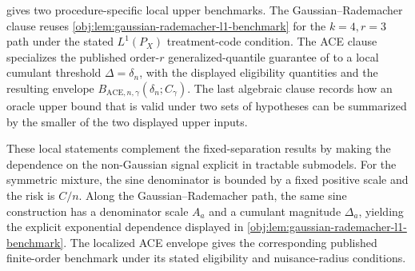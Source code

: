  gives two procedure-specific local upper benchmarks. The Gaussian--Rademacher clause reuses \cref{obj:lem:gaussian-rademacher-l1-benchmark} for the \(k=4,r=3\) path under the stated \(L^1(P_X)\) treatment-code condition. The ACE clause specializes the published order-\(r\) generalized-quantile guarantee of \citet{JinMackeySyrgkanis2025} to a local cumulant threshold \(\Delta=\delta_n\), with the displayed eligibility quantities and the resulting envelope \(B_{\mathrm{ACE},n,\gamma}(\delta_n;C_{\gamma})\). The last algebraic clause records how an oracle upper bound that is valid under two sets of hypotheses can be summarized by the smaller of the two displayed upper inputs.

These local statements complement the fixed-separation results by making the dependence on the non-Gaussian signal explicit in tractable submodels. For the symmetric mixture, the sine denominator is bounded by a fixed positive scale and the risk is \(C/n\). Along the Gaussian--Rademacher path, the same sine construction has a denominator scale \(A_a\) and a cumulant magnitude \(\Delta_a\), yielding the explicit exponential dependence displayed in \cref{obj:lem:gaussian-rademacher-l1-benchmark}. The localized ACE envelope gives the corresponding published finite-order benchmark under its stated eligibility and nuisance-radius conditions.
